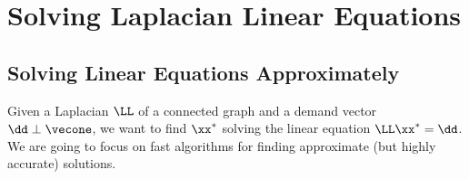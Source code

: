 
\chapter{Solving Laplacian
  Linear Equations}








%
\sloppy






\section{Solving Linear Equations Approximately}

Given a Laplacian $\LL$ of a connected graph and a demand vector
$\dd \perp \vecone$, we want to find $\xx^*$ solving the linear equation
$\LL \xx^* = \dd$.
We are going to focus on fast algorithms for finding approximate (but
highly accurate) solutions.


